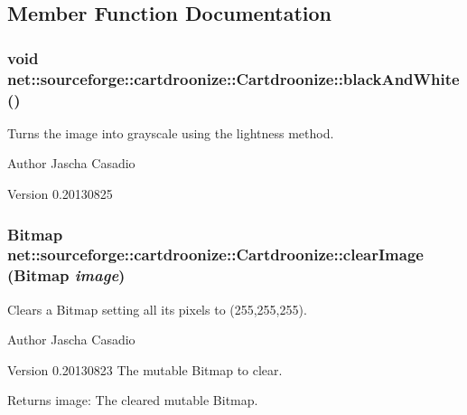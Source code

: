 \subsection{Member Function Documentation}
\hypertarget{classnet_1_1sourceforge_1_1cartdroonize_1_1Cartdroonize_abbc322e6d633e277771992237b039c15}{
\subsubsection[{blackAndWhite}]{\setlength{\rightskip}{0pt plus 5cm}void net::sourceforge::cartdroonize::Cartdroonize::blackAndWhite ()}}
\label{classnet_1_1sourceforge_1_1cartdroonize_1_1Cartdroonize_abbc322e6d633e277771992237b039c15}


Turns the image into grayscale using the lightness method. \begin{DoxyAuthor}{Author}
Jascha Casadio 
\end{DoxyAuthor}
\begin{DoxyVersion}{Version}
0.20130825
\end{DoxyVersion}


\hypertarget{classnet_1_1sourceforge_1_1cartdroonize_1_1Cartdroonize_a25e2dc7b8de4289b58de1a93dc4b6baf}{
\subsubsection[{clearImage}]{\setlength{\rightskip}{0pt plus 5cm}Bitmap net::sourceforge::cartdroonize::Cartdroonize::clearImage (Bitmap {\em image})}}
\label{classnet_1_1sourceforge_1_1cartdroonize_1_1Cartdroonize_a25e2dc7b8de4289b58de1a93dc4b6baf}


Clears a Bitmap setting all its pixels to (255,255,255). \begin{DoxyAuthor}{Author}
Jascha Casadio 
\end{DoxyAuthor}
\begin{DoxyVersion}{Version}
0.20130823  The mutable Bitmap to clear. 
\end{DoxyVersion}
\begin{DoxyReturn}{Returns}
image: The cleared mutable Bitmap.
\end{DoxyReturn}


